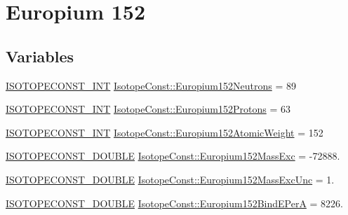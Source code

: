 \hypertarget{group___isotope_const-_europium-_eu152}{}\section{Europium 152}
\label{group___isotope_const-_europium-_eu152}
\subsection*{Variables}
\begin{DoxyCompactItemize}
\item 
\mbox{\hyperlink{group___isotope_const-_macros_ga5f18360b3e99483a35c32d789e62621c}{I\+S\+O\+T\+O\+P\+E\+C\+O\+N\+S\+T\+\_\+\+I\+NT}} \mbox{\hyperlink{group___isotope_const-_europium-_eu152_ga6114723f6719e9813ca8c10d76e0cdcc}{Isotope\+Const\+::\+Europium152\+Neutrons}} = 89
\item 
\mbox{\hyperlink{group___isotope_const-_macros_ga5f18360b3e99483a35c32d789e62621c}{I\+S\+O\+T\+O\+P\+E\+C\+O\+N\+S\+T\+\_\+\+I\+NT}} \mbox{\hyperlink{group___isotope_const-_europium-_eu152_ga3b61a65a88040d2e0635f77de8fa7c19}{Isotope\+Const\+::\+Europium152\+Protons}} = 63
\item 
\mbox{\hyperlink{group___isotope_const-_macros_ga5f18360b3e99483a35c32d789e62621c}{I\+S\+O\+T\+O\+P\+E\+C\+O\+N\+S\+T\+\_\+\+I\+NT}} \mbox{\hyperlink{group___isotope_const-_europium-_eu152_ga62bb32a67ae51a5417da5ce61074bbea}{Isotope\+Const\+::\+Europium152\+Atomic\+Weight}} = 152
\item 
\mbox{\hyperlink{group___isotope_const-_macros_ga8f45a7272ce02c0b4c65c44636ed719a}{I\+S\+O\+T\+O\+P\+E\+C\+O\+N\+S\+T\+\_\+\+D\+O\+U\+B\+LE}} \mbox{\hyperlink{group___isotope_const-_europium-_eu152_gad5c9ccf2ca3cb231ee04b9c92f3f7813}{Isotope\+Const\+::\+Europium152\+Mass\+Exc}} = -\/72888.
\item 
\mbox{\hyperlink{group___isotope_const-_macros_ga8f45a7272ce02c0b4c65c44636ed719a}{I\+S\+O\+T\+O\+P\+E\+C\+O\+N\+S\+T\+\_\+\+D\+O\+U\+B\+LE}} \mbox{\hyperlink{group___isotope_const-_europium-_eu152_ga20355bc4ab48ab9a0589e1ca41eb32bb}{Isotope\+Const\+::\+Europium152\+Mass\+Exc\+Unc}} = 1.
\item 
\mbox{\hyperlink{group___isotope_const-_macros_ga8f45a7272ce02c0b4c65c44636ed719a}{I\+S\+O\+T\+O\+P\+E\+C\+O\+N\+S\+T\+\_\+\+D\+O\+U\+B\+LE}} \mbox{\hyperlink{group___isotope_const-_europium-_eu152_ga97171d5547a961208e4f428b455a86f5}{Isotope\+Const\+::\+Europium152\+Bind\+E\+PerA}} = 8226.
\item 

\end{DoxyCompactItemize}
